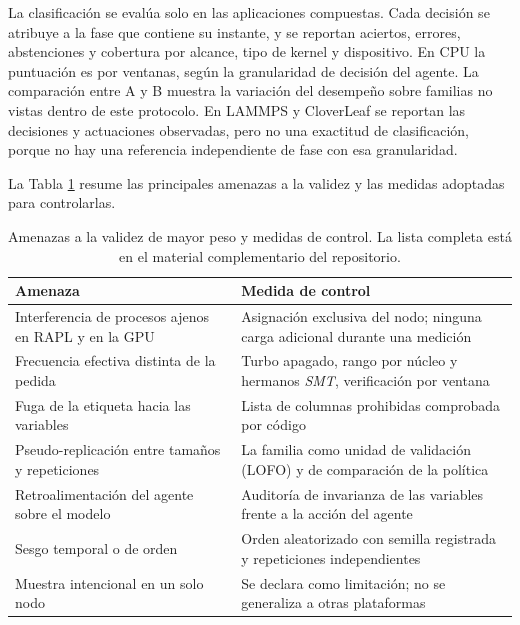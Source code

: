 La clasificación se evalúa solo en las aplicaciones compuestas. Cada decisión se atribuye a la fase que contiene su instante, y se reportan aciertos, errores, abstenciones y cobertura por alcance, tipo de kernel y dispositivo. En CPU la puntuación es por ventanas, según la granularidad de decisión del agente. La comparación entre A y B muestra la variación del desempeño sobre familias no vistas dentro de este protocolo. En LAMMPS y CloverLeaf se reportan las decisiones y actuaciones observadas, pero no una exactitud de clasificación, porque no hay una referencia independiente de fase con esa granularidad.

La Tabla \ref{tab:met-amenazas-resumen} resume las principales amenazas a la validez y las medidas adoptadas para controlarlas.
\begin{table}[H]
\centering
\caption[Amenazas a la validez y medidas de control]{Amenazas a la validez de mayor peso y medidas de control. La lista completa está en el material complementario del repositorio.}
\label{tab:met-amenazas-resumen}
\small
\begin{tabular}{@{}>{\raggedright\arraybackslash}p{4.6cm}>{\raggedright\arraybackslash}p{9.2cm}@{}}
\toprule
\textbf{Amenaza} & \textbf{Medida de control} \\
\midrule
Interferencia de procesos ajenos en RAPL y en la GPU & Asignación exclusiva del nodo; ninguna carga adicional durante una medición \\
Frecuencia efectiva distinta de la pedida & Turbo apagado, rango por núcleo y hermanos \textit{SMT}, verificación por ventana \\
Fuga de la etiqueta hacia las variables & Lista de columnas prohibidas comprobada por código \\
Pseudo-replicación entre tamaños y repeticiones & La familia como unidad de validación (LOFO) y de comparación de la política \\
Retroalimentación del agente sobre el modelo & Auditoría de invarianza de las variables frente a la acción del agente \\
Sesgo temporal o de orden & Orden aleatorizado con semilla registrada y repeticiones independientes \\
Muestra intencional en un solo nodo & Se declara como limitación; no se generaliza a otras plataformas \\
\bottomrule
\end{tabular}
\end{table}
